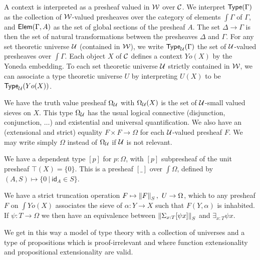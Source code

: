 A context is interpreted as a presheaf valued in $\mathcal{W}$ over $\mathcal{C}$. We interpret $\mathsf{Type}(\Gamma)$ as the collection of
$\mathcal{W}$-valued presheaves over the category of elements $\int\Gamma$ of $\Gamma$,
and $\mathsf{Elem}(\Gamma,A)$ as the set of global sections of the presheaf $A$. The set $\Delta\rightarrow\Gamma$ is then the set
of natural transformations between the presheaves $\Delta$ and $\Gamma$.
For any set theoretic universe $\mathcal{U}$ (contained in $\mathcal{W}$), we write $\mathsf{Type}_{\mathcal{U}}(\Gamma)$ the set of $\mathcal{U}$-valued
presheaves over $\int\Gamma$. Each object $X$ of $\mathcal{C}$ defines a context $Yo(X)$ by the Yoneda embedding.
To each set theoretic universe $\mathcal{U}$ strictly contained in $\mathcal{W}$, we can associate a type theoretic universe $U$ by interpreting
$U(X)$ to be $\mathsf{Type}_{\mathcal{U}}(Yo(X))$.

    We have the truth value presheaf $\Omega_{\mathcal{U}}$ with $\Omega_{\mathcal{U}}(X)$ is the set of $\mathcal{U}$-small valued sieves on $X$.
    This type $\Omega_{\mathcal{U}}$ has the usual logical connective (disjunction, conjunction,
    $\dots$) and existential and universal quantification. We also have an (extensional and strict)
    equality $F\times F\rightarrow\Omega$ for each $\mathcal{U}$-valued presheaf $F$. We may write simply $\Omega$ instead
    of $\Omega_{\mathcal{U}}$ if $\mathcal{U}$ is not relevant.

    We have a dependent type $[p]$ for $p:\Omega$, with $[p]$ subpresheaf of the unit presheaf $\top(X) = \{0\}$.
    This is a presheaf $[\_]$
    over $\int\Omega$, defined by $(A,S)\mapsto \{0~|~\mathsf{id}_A\in S\}$.

    We have a strict truncation operation $F\mapsto \left\lVert F \right\rVert_S,~U\rightarrow\Omega$, which to any presheaf $F$ on $\int Yo(X)$
    associates the sieve of $\alpha:Y\rightarrow X$ such that $F(Y,\alpha)$ is inhabited. If $\psi:T\rightarrow\Omega$
    we then have an equivalence between  $\left\lVert \Sigma_{x:T}[\psi x] \right\rVert_S$ and $\exists_{x:T}\psi x$.

    We get in this way a model of type theory with a collection of universes \cite{huber-phd-thesis} and a type of propositions
    which is proof-irrelevant and where function extensionality and propositional extensionality are valid.

